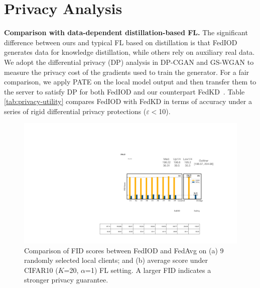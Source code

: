 \documentclass[letterpaper]{article} %
\begin{document}
\section{Privacy Analysis}
\textbf{Comparison with data-dependent distillation-based FL.}
The significant difference between ours and typical FL based on distillation is that FedIOD generates data for knowledge distillation, while others rely on auxiliary real data. We adopt the differential privacy (DP) analysis in DP-CGAN \cite{torkzadehmahani2019dp} and GS-WGAN \cite{chen2020gs} to measure the privacy cost of the gradients used to train the generator. For a fair comparison, we apply PATE \cite{papernot2018scalable} on the local model output and then transfer them to the server to satisfy DP for both FedIOD and our counterpart FedKD~\cite{gong2022preserving}. Table \ref{tab:privacy-utility} compares FedIOD with FedKD in terms of accuracy under a series of rigid differential privacy protections ($\varepsilon <$10).



\begin{figure}[h]
\centering
\includegraphics[width=0.95\linewidth]{fig/fig6.pdf}
\caption{ Comparison of FID scores between FedIOD and FedAvg on (a) 9 randomly selected local clients; and (b) average score under CIFAR10 ($K$=20, $\alpha$=1) FL setting. A larger FID indicates a stronger privacy guarantee.
}
\label{fig:fid}
\end{figure}

\end{document}
